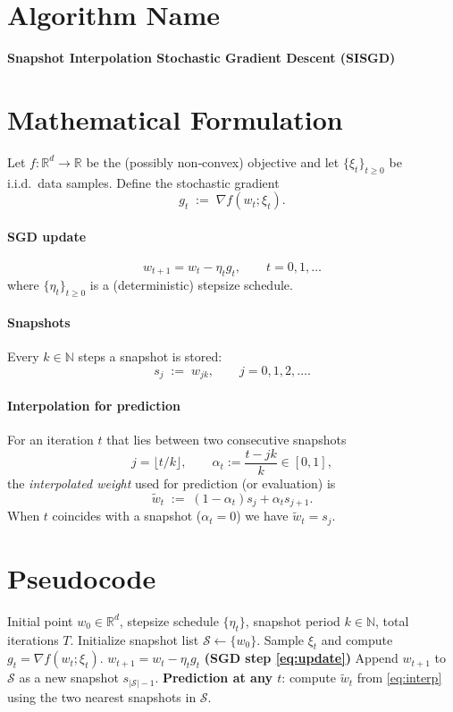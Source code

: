 \documentclass{article}
\begin{document}
\section*{Algorithm Name}
\textbf{Snapshot Interpolation Stochastic Gradient Descent (SISGD)}

\section*{Mathematical Formulation}
Let $f:\mathbb{R}^d\rightarrow\mathbb{R}$ be the (possibly non‑convex) objective and let $\{\xi_t\}_{t\ge 0}$ be i.i.d.\ data samples.  
Define the stochastic gradient
\[
g_t\;:=\;\nabla f(w_t;\xi_t).
\]

\paragraph{SGD update}
\begin{equation}
\label{eq:update}
w_{t+1}=w_t-\eta_t g_t ,\qquad t=0,1,\dots
\end{equation}
where $\{\eta_t\}_{t\ge0}$ is a (deterministic) stepsize schedule.

\paragraph{Snapshots}
Every $k\in\mathbb{N}$ steps a snapshot is stored:
\[
s_j \;:=\; w_{jk},\qquad j=0,1,2,\dots .
\]

\paragraph{Interpolation for prediction}
For an iteration $t$ that lies between two consecutive snapshots
\[
j=\big\lfloor t/k\big\rfloor,\qquad 
\alpha_t:=\frac{t-jk}{k}\in[0,1],
\]
the \emph{interpolated weight} used for prediction (or evaluation) is
\begin{equation}
\label{eq:interp}
\tilde w_t \;:=\;(1-\alpha_t)s_{j}+ \alpha_t s_{j+1}.
\end{equation}
When $t$ coincides with a snapshot ($\alpha_t=0$) we have $\tilde w_t=s_j$.

\section*{Pseudocode}
\begin{algorithm}[H]
\caption{SISGD}
\begin{algorithmic}[1]
\REQUIRE Initial point $w_0\in\mathbb{R}^d$, stepsize schedule $\{\eta_t\}$, snapshot period $k\in\mathbb{N}$, total iterations $T$.
\STATE Initialize snapshot list $\mathcal{S}\leftarrow\{w_0\}$.
    \STATE Sample $\xi_t$ and compute $g_t=\nabla f(w_t;\xi_t)$.
    \STATE $w_{t+1}=w_t-\eta_t g_t$            \hfill\textbf{(SGD step \eqref{eq:update})}
        \STATE Append $w_{t+1}$ to $\mathcal{S}$ as a new snapshot $s_{|\mathcal{S}|-1}$.
    \ENDIF
\ENDFOR
\STATE \textbf{Prediction at any $t$}: compute $\tilde w_t$ from \eqref{eq:interp} using the two nearest snapshots in $\mathcal{S}$.
\end{algorithmic}
\end{algorithm}
\end{document}
